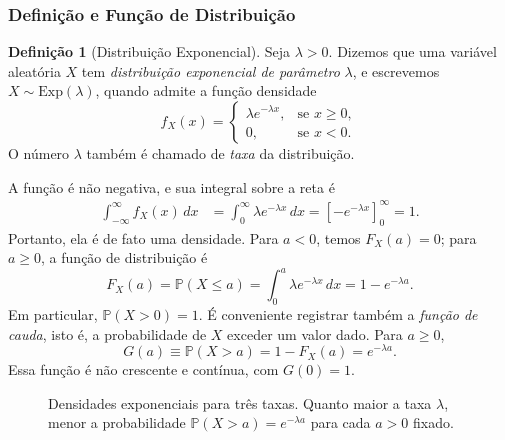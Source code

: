 \documentclass[12pt,portuguese]{article}
\theoremstyle{definition}
\newtheorem{definition}[definition]{Definição}
\theoremstyle{plainexercise}
\theoremstyle{starredexercise}
\theoremstyle{definition}
\begin{document}
\subsubsection{Definição e Função de Distribuição}

\begin{definition}[Distribuição Exponencial]\label{def:distribuicao-exponencial}
Seja $\lambda>0$. Dizemos que uma variável aleatória $X$ tem
\emph{distribuição exponencial de parâmetro} $\lambda$, e escrevemos
$X\sim\mathrm{Exp}(\lambda)$, quando admite a função densidade
\[
  f_X(x)=
  \begin{cases}
    \lambda e^{-\lambda x}, & \text{se } x\geqslant 0,
    \\[0.2cm]
    0, & \text{se } x<0.
  \end{cases}
\]
O número $\lambda$ também é chamado de \emph{taxa} da distribuição.
\end{definition}

A função é não negativa, e sua integral sobre a reta é
\begin{align*}
  \int_{-\infty}^{\infty} f_X(x)\,dx
  &=\int_0^{\infty}\lambda e^{-\lambda x}\,dx
  =\left[-e^{-\lambda x}\right]_0^{\infty}=1.
\end{align*}
Portanto, ela é de fato uma densidade. Para $a<0$, temos $F_X(a)=0$;
para $a\geqslant0$, a função de distribuição é
\begin{equation}\label{eq:fda-exponencial}
  F_X(a)=\mathbb{P}(X\leqslant a)
  =\int_0^a\lambda e^{-\lambda x}\,dx=1-e^{-\lambda a}.
\end{equation}
Em particular, $\mathbb{P}(X>0)=1$. É conveniente registrar também a
\emph{função de cauda}, isto é, a probabilidade de $X$ exceder um valor
dado. Para $a\geqslant0$,
\begin{equation}\label{eq:cauda-exponencial}
  G(a)\equiv\mathbb{P}(X>a)=1-F_X(a)=e^{-\lambda a}.
\end{equation}
Essa função é não crescente e contínua, com $G(0)=1$.

\begin{figure}[H]
\centering
{}
\caption{Densidades exponenciais para três taxas. Quanto maior a taxa
$\lambda$, menor a probabilidade $\mathbb{P}(X>a)=e^{-\lambda a}$ para
cada $a>0$ fixado.}
\label{fig:densidades-exponenciais}
\end{figure}
\end{document}
